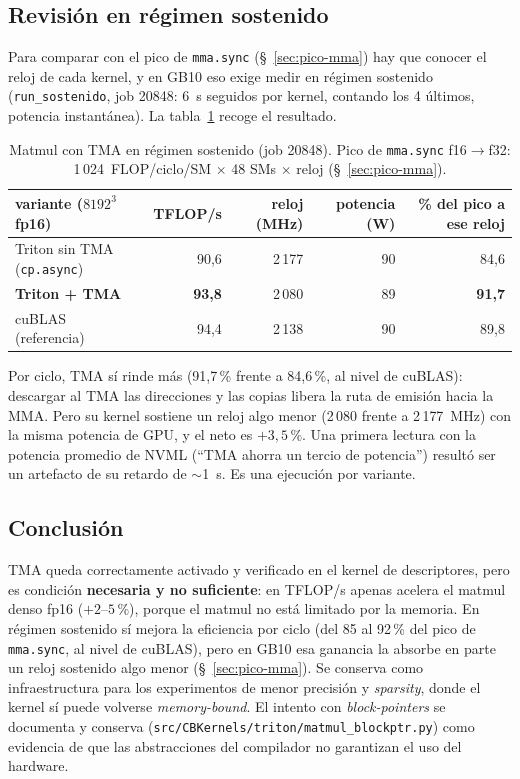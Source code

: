 \subsection{Revisión en régimen sostenido}

Para comparar con el pico de \texttt{mma.sync} (§~\ref{sec:pico-mma}) hay que conocer el reloj de
cada kernel, y en GB10 eso exige medir en régimen sostenido (\texttt{run\_sostenido}, job 20848:
6~s seguidos por kernel, contando los 4 últimos, potencia instantánea). La
tabla~\ref{tab:tma-reloj} recoge el resultado.

\begin{table}[htbp]
  \centering\small
  \begin{tabular}{lrrrr}
    \toprule
    variante ($8192^3$ fp16) & TFLOP/s & reloj (MHz) & potencia (W) & \% del pico a ese reloj \\
    \midrule
    Triton sin TMA (\texttt{cp.async}) & 90{,}6 & 2\,177 & 90 & 84{,}6 \\
    \textbf{Triton + TMA} & \textbf{93{,}8} & 2\,080 & 89 & \textbf{91{,}7} \\
    cuBLAS (referencia) & 94{,}4 & 2\,138 & 90 & 89{,}8 \\
    \bottomrule
  \end{tabular}
  \caption{Matmul con TMA en régimen sostenido (job 20848). Pico de \texttt{mma.sync} f16$\to$f32:
  1\,024~FLOP/ciclo/SM $\times$ 48 SMs $\times$ reloj (§~\ref{sec:pico-mma}).}
  \label{tab:tma-reloj}
\end{table}

Por ciclo, TMA sí rinde más (91{,}7\,\% frente a 84{,}6\,\%, al nivel de cuBLAS): descargar al
TMA las direcciones y las copias libera la ruta de emisión hacia la MMA. Pero su kernel sostiene
un reloj algo menor (2\,080 frente a 2\,177~MHz) con la misma potencia de GPU, y el neto es
$+3{,}5\,\%$. Una primera lectura con la potencia promedio de NVML (``TMA ahorra un tercio de
potencia'') resultó ser un artefacto de su retardo de $\sim$1~s. Es una ejecución por variante.

\subsection{Conclusión}

TMA queda correctamente activado y verificado en el kernel de descriptores, pero es
condición \textbf{necesaria y no suficiente}: en TFLOP/s apenas acelera el matmul denso fp16
($+2$--$5\,\%$), porque el matmul no está limitado por la memoria. En régimen sostenido sí mejora
la eficiencia por ciclo (del 85 al 92\,\% del pico de \texttt{mma.sync}, al nivel de cuBLAS), pero
en GB10 esa ganancia la absorbe en parte un reloj sostenido algo menor (§~\ref{sec:pico-mma}). Se conserva como infraestructura para los
experimentos de menor precisión y \emph{sparsity}, donde el kernel sí puede volverse
\emph{memory-bound}. El intento con \emph{block-pointers} se documenta y conserva
(\texttt{src/CBKernels/triton/matmul\_blockptr.py}) como evidencia de que las
abstracciones del compilador no garantizan el uso del hardware.
